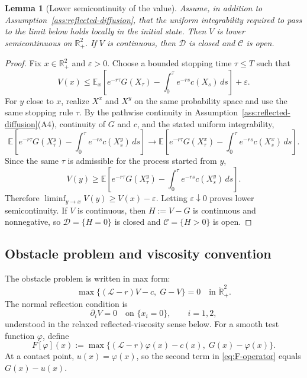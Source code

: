 \documentclass[pdflatex,sn-mathphys-num]{sn-jnl}
\theoremstyle{plain}
\newtheorem{lemma}[theorem]{Lemma}
\theoremstyle{definition}
\newcommand{\R}{\mathbb{R}}
\newcommand{\interior}[1]{\mathring{#1}}
\begin{document}
\begin{lemma}[Lower semicontinuity of the value]
\label{lem:value-lsc}
Assume, in addition to Assumption~\ref{ass:reflected-diffusion}, that the
uniform integrability required to pass to the limit below holds locally in the
initial state. Then $V$ is lower semicontinuous on $\R^2_+$. If $V$ is
continuous, then $\mathcal D$ is closed and $\mathcal C$ is open.
\end{lemma}
\begin{proof}
Fix $x\in\R^2_+$ and $\varepsilon>0$. Choose a bounded stopping time
$\tau\le T$ such that
\[
   V(x)
   \le
   \mathbb E_x\left[
      e^{-r\tau}G(X_\tau)
      -
      \int_0^\tau e^{-rs}c(X_s)\,ds
   \right]
   +\varepsilon.
\]
For $y$ close to $x$, realize $X^x$ and $X^y$ on the same probability space
and use the same stopping rule $\tau$. By the pathwise continuity in
Assumption~\ref{ass:reflected-diffusion}\textup{(A4)}, continuity of $G$ and
$c$, and the stated uniform integrability,
\[
   \mathbb E\left[
      e^{-r\tau}G(X_\tau^y)
      -\int_0^\tau e^{-rs}c(X_s^y)\,ds
   \right]
   \longrightarrow
   \mathbb E\left[
      e^{-r\tau}G(X_\tau^x)
      -\int_0^\tau e^{-rs}c(X_s^x)\,ds
   \right].
\]
Since the same $\tau$ is admissible for the process started from $y$,
\[
   V(y)
   \ge
   \mathbb E\left[
      e^{-r\tau}G(X_\tau^y)
      -\int_0^\tau e^{-rs}c(X_s^y)\,ds
   \right].
\]
Therefore $\liminf_{y\to x}V(y)\ge V(x)-\varepsilon$. Letting
$\varepsilon\downarrow0$ proves lower semicontinuity. If $V$ is continuous,
then $H:=V-G$ is continuous and nonnegative, so $\mathcal D=\{H=0\}$ is closed
and $\mathcal C=\{H>0\}$ is open.
\end{proof}

\subsection{Obstacle problem and viscosity convention}
\label{sec:obstacle-viscosity}
The obstacle problem is written in max form:
\begin{equation}
\label{eq:obstacle-max}
   \max\{(\mathcal L-r)V-c,\;G-V\}=0
   \quad\text{in }\interior{\R}^2_+.
\end{equation}
The normal reflection condition is
\begin{equation}
\label{eq:neumann-condition}
   \partial_i V=0
   \quad\text{on }\{x_i=0\},
   \qquad i=1,2,
\end{equation}
understood in the relaxed reflected-viscosity sense below. For a smooth test
function $\varphi$, define
\begin{equation}
\label{eq:F-operator}
   F[\varphi](x)
   :=
   \max\{(\mathcal L-r)\varphi(x)-c(x),\;G(x)-\varphi(x)\}.
\end{equation}
At a contact point, $u(x)=\varphi(x)$, so the second term in
\eqref{eq:F-operator} equals $G(x)-u(x)$.
\end{document}
